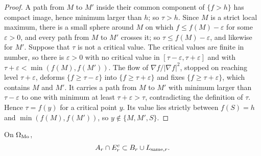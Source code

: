 \begin{proof}
A path from $M$ to $M'$ inside their common component of $\{f>h\}$ has compact image, hence minimum larger than $h$; so $\tau>h$. Since $M$ is a strict local maximum, there is a small sphere around $M$ on which $f\le f(M)-\varepsilon$ for some $\varepsilon>0$, and every path from $M$ to $M'$ crosses it; so $\tau\le f(M)-\varepsilon$, and likewise for $M'$. Suppose that $\tau$ is not a critical value. The critical values are finite in number, so there is $\varepsilon>0$ with no critical value in $[\tau-\varepsilon,\tau+\varepsilon]$ and with $\tau+\varepsilon<\min(f(M),f(M'))$. The flow of $\nabla f/|\nabla f|^2$, stopped on reaching level $\tau+\varepsilon$, deforms $\{f\ge\tau-\varepsilon\}$ into $\{f\ge\tau+\varepsilon\}$ and fixes $\{f\ge\tau+\varepsilon\}$, which contains $M$ and $M'$. It carries a path from $M$ to $M'$ with minimum larger than $\tau-\varepsilon$ to one with minimum at least $\tau+\varepsilon>\tau$, contradicting the definition of $\tau$. Hence $\tau=f(y)$ for a critical point $y$. Its value lies strictly between $f(S)=h$ and $\min(f(M),f(M'))$, so $y\notin\{M,M',S\}$.
\end{proof}

\begin{lemma}\label{lem:selection-trichotomy}
On $\Omega_{\rm Mo}$,
\begin{equation}\label{eq:selection-trichotomy}
A_r\cap E_r^c\subset B_r\cup L_{{\rm same},r}.
\end{equation}
\end{lemma}

